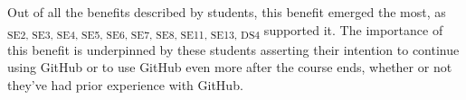 Out of all the benefits described by students, this benefit emerged the most, as \textsubscript{SE2, SE3, SE4, SE5, SE6, SE7, SE8, SE11, SE13, DS4} supported it. The importance of this benefit is underpinned by these students asserting their intention to continue using GitHub or to use GitHub even more after the course ends, whether or not they've had prior experience with GitHub. \\





